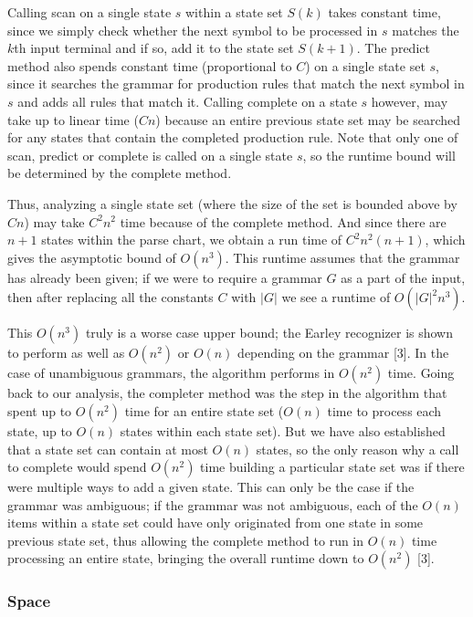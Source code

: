 \documentclass[a4paper, 11pt]{article}
\begin{document}
Calling scan on a single state $s$ within a state set $S(k)$ takes constant time, since we simply check whether the next symbol to be processed in $s$ matches the $k$th 
input terminal and if so, add it to the state set $S(k+1)$. The predict method also spends constant time (proportional to $C$) on a single state set $s$, since it searches
the grammar for production rules that match the next symbol in $s$ and adds all rules that match it. Calling complete on a state $s$ however, may take up to linear time
($Cn$) because an entire previous state set may be searched for any states that contain the completed production rule. Note that only one of scan, predict or complete is
called on a single state $s$, so the runtime bound will be determined by the complete method.

Thus, analyzing a single state set (where the size of the set is bounded above by $Cn$) may take $C^2 n^2$ time because of the complete method. And since there are $n+1$ states
within the parse chart, we obtain a run time of $C^2 n^2 (n+1)$, which gives the asymptotic bound of $O(n^3)$.
This runtime assumes that the grammar has already been given; if we were to require a grammar $G$ as a part of the input, then after replacing all 
the constants $C$ with $|G|$ we see a runtime of $O(|G|^2 n^3)$.

This $O(n^3)$ truly is a worse case upper bound; the Earley recognizer is shown to perform as well as $O(n^2)$ or $O(n)$ depending on the grammar [3]. In the case of 
unambiguous grammars, the algorithm performs in $O(n^2)$ time. Going back to our analysis, the completer method was the step in the algorithm that spent up to $O(n^2)$ time
for an entire state set ($O(n)$ time to process each state, up to $O(n)$ states within each state set). But we have also established that a state set can contain at most
$O(n)$ states, so the only reason why a call to complete would spend $O(n^2)$ time building a particular state set was if there were multiple ways to add a given state.
This can only be the case if the grammar was ambiguous; if the grammar was not ambiguous, each of the $O(n)$ items within a state set could have only originated from one state
in some previous state set, thus allowing the complete method to run in $O(n)$ time processing an entire state, bringing the overall runtime down to $O(n^2)$ [3].

\subsubsection{Space}
\end{document}
